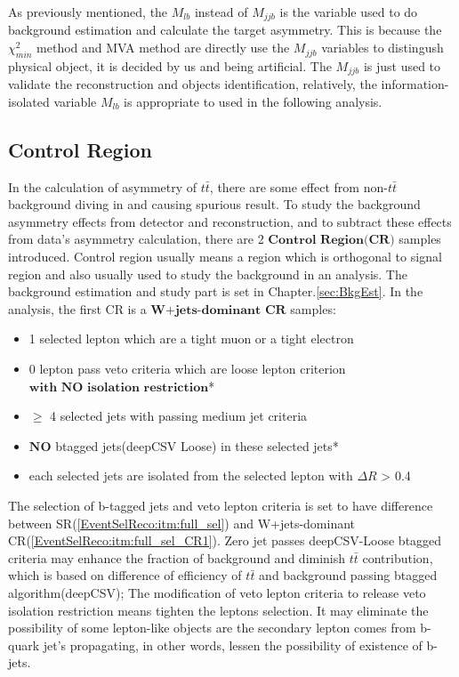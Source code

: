 		As previously mentioned, the $M_{lb}$ instead of $M_{jjb}$ is the variable used to do background estimation and calculate the target asymmetry. This is because the $\chi^2_{min}$ method and MVA method are directly use the $M_{jjb}$ variables to distingush physical object, it is decided by us and being artificial. The $M_{jjb}$ is just used to validate the reconstruction and objects identification, relatively, the information-isolated variable $M_{lb}$ is appropriate to used in the following analysis.


	\subsection{Control Region}
	\label{ssec:CR}

		In the calculation of asymmetry of $t\bar{t}$, there are some effect from non-$t\bar{t}$ background diving in and causing spurious result. To study the background asymmetry effects from detector and reconstruction, and to subtract these effects from data's asymmetry calculation, there are 2 $\textbf{Control Region(CR)}$ samples introduced. Control region usually means a region which is orthogonal to signal region and also usually used to study the background in an analysis. The background estimation and study part is set in Chapter.\ref{sec:BkgEst}. In the analysis, the first CR is a $\textbf{W+jets-dominant CR}$ samples:

		\begin{itemize}
	  		\item 1 selected lepton which are a tight muon or a tight electron
	  		\item 0 lepton pass veto criteria which are loose lepton criterion $\textbf{with NO isolation restriction}$*
	  		\item $\geq$ 4 selected jets with passing medium jet criteria
	  		\item $\textbf{NO}$ btagged jets(deepCSV Loose) in these selected jets*
	  		\item each selected jets are isolated from the selected lepton with $\Delta R$ > 0.4
	  	\label{EventSelReco:itm:full_sel_CR1}
		\end{itemize}

		The selection of b-tagged jets and veto lepton criteria is set to have difference between SR(\ref{EventSelReco:itm:full_sel}) and W+jets-dominant CR(\ref{EventSelReco:itm:full_sel_CR1}). Zero jet passes deepCSV-Loose btagged criteria may enhance the fraction of background and diminish $t\bar{t}$ contribution, which is based on difference of efficiency of $t\bar{t}$ and background passing btagged algorithm(deepCSV); The modification of veto lepton criteria to release veto isolation restriction means tighten the leptons selection. It may eliminate the possibility of some lepton-like objects are the secondary lepton comes from b-quark jet's propagating, in other words, lessen the possibility of existence of b-jets.

